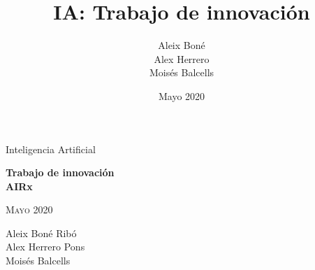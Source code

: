 

\usepackage[bottom]{footmisc}

\usepackage{amsmath}
\usepackage[justification=centering]{caption}

\title{%
IA: Trabajo de innovación
}

\author{%
    Aleix Boné\\
    Alex Herrero\\
    Moisés Balcells
}
\date{%
Mayo 2020
}

 


\thispagestyle{empty}
\clearpage
\setcounter{page}{-1}

\begin{titlepage}
{
    \centering
    \null
    \vfill
    {\Large Inteligencia Artificial\par}
    \vspace{2em}
    {\Huge \bfseries 
    Trabajo de innovación \\
    AIRx %
    \par}
    \vspace{2em}
    {\large \scshape 
    Mayo 2020
    \par}
    \vfill
\begin{center}
    
\end{center}
    \vspace{3cm}

    \vfill
    {\raggedleft \large
Aleix Boné Ribó\\
Alex Herrero Pons\\
    Moisés Balcells
        \par}
}
\end{titlepage}

\pagebreak

\thispagestyle{empty}
\clearpage
\setcounter{page}{0}

\tableofcontents

\pagebreak

%


